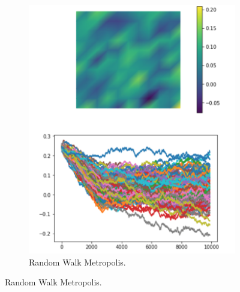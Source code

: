 \documentclass[9pt]{beamer}
\begin{document}
\begin{frame}
\begin{figure}
\begin{subfigure}{0.3\textwidth}
	\includegraphics[scale = 0.3]{pCN_noObs.png}
	\caption{Random Walk Metropolis.}
\end{subfigure}
\end{figure}

\end{frame}


\end{document}
